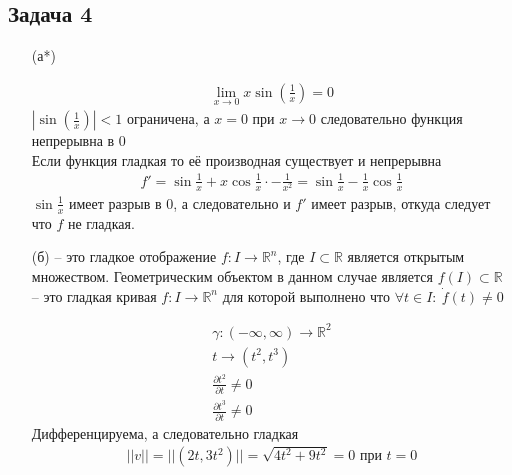 \subsection*{Задача 4}
\begin{enumerate}
	\item[(а*)]
	\begin{gather*}
		\lim\limits_{x \to 0} x \sin \left(\frac{1}{x}\right) = 0
	\end{gather*}
	$|\sin \left(\frac{1}{x}\right)|<1$ ограничена, а $x=0$ при $x \to 0$ следовательно функция непрерывна в 0\\
	Если функция гладкая то её производная существует и непрерывна
	\begin{gather*}
		f' = \sin \frac{1}{x} + x \cos \frac{1}{x} \cdot -\frac{1}{x^2} = \sin \frac{1}{x} - \frac{1}{x} \cos \frac{1}{x}
	\end{gather*}
	$\sin \frac{1}{x}$ имеет разрыв в 0, а следовательно и $f'$ имеет разрыв, откуда следует что $f$ не гладкая.
	
	\item[(б)]
	 -- это гладкое отображение $f: I \to \mathbb{R}^n$, где $I \subset \mathbb{R}$ является открытым множеством. Геометрическим объектом в данном случае является $f(I) \subset \mathbb{R}$\\
	 -- это гладкая кривая $f: I \to \mathbb{R}^n$ для которой выполнено что $\forall t \in I:\ \dot{f}(t) \ne 0$\\
	\begin{gather*}
		\gamma:(-\infty, \infty) \to \mathbb{R}^{2}\\
		t \to (t^2, t^3)\\
		\frac{\partial t^2}{\partial t} \ne 0\\
		\frac{\partial t^3}{\partial t} \ne 0
	\end{gather*}
	Дифференцируема, а следовательно гладкая
	\begin{gather*}
		||v|| = ||(2t,3t^2)|| = \sqrt{4t^2 + 9t^2} = 0 \text{ при } t=0
	\end{gather*}
\end{enumerate}


